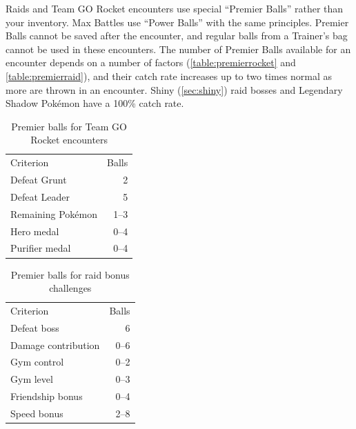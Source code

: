 Raids and Team GO Rocket encounters use special ``Premier Balls'' rather than your inventory.
Max Battles use ``Power Balls'' with the same principles.
Premier Balls cannot be saved after the encounter, and regular balls from
  a Trainer's bag cannot be used in these encounters.
The number of Premier Balls available for an encounter depends on a number of factors (\autoref{table:premierrocket}
  and \autoref{table:premierraid}), and their catch rate increases up to two times normal as more are thrown in an encounter.
Shiny (\autoref{sec:shiny}) raid bosses and Legendary Shadow Pokémon have a 100\% catch rate.
\begin{table}
\centering
\begin{tabular}{lr}
Criterion & Balls\\
\Midrule
Defeat Grunt & 2\\
Defeat Leader & 5\\
Remaining Pokémon & 1--3\\
Hero medal & 0--4\\
Purifier medal & 0--4\\
\end{tabular}
\caption{Premier balls for Team GO Rocket encounters}
\label{table:premierrocket}
\end{table}
\begin{table}
\centering
\begin{tabular}{lr}
Criterion & Balls\\
\Midrule
  Defeat boss & 6\\
  Damage contribution & 0--6\\
  Gym control & 0--2\\
  Gym level & 0--3\\
  Friendship bonus & 0--4\\
  Speed bonus & 2--8\\
\end{tabular}
\caption{Premier balls for raid bonus challenges}
\label{table:premierraid}
\end{table}

